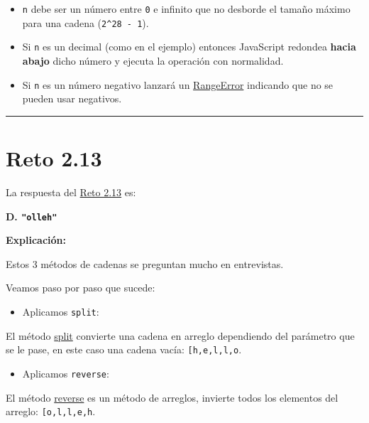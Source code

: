 \documentclass[
  letterpaper,
  DIV=11,
  numbers=noendperiod]{scrreprt}
\providecommand{\tightlist}{%
  \setlength{\itemsep}{0pt}\setlength{\parskip}{0pt}}
\begin{document}
\begin{itemize}
\item
  \texttt{n} debe ser un número entre \texttt{0} e infinito que no
  desborde el tamaño máximo para una cadena (\texttt{2\^{}28\ -\ 1}).
\item
  Si \texttt{n} es un decimal (como en el ejemplo) entonces JavaScript
  redondea \textbf{hacia abajo} dicho número y ejecuta la operación con
  normalidad.
\item
  Si \texttt{n} es un número negativo lanzará un
  \hyperref[glos-rangeerror]{RangeError} indicando que no se pueden usar
  negativos.
\end{itemize}

\begin{center}\rule{0.5\linewidth}{0.5pt}\end{center}

\section{Reto 2.13}\label{sec-sol-cap2-reto13}

La respuesta del \hyperref[sec-cap2-reto13]{Reto 2.13} es:

\textbf{D. \texttt{"olleh"}}

\textbf{Explicación:}

Estos 3 métodos de cadenas se preguntan mucho en entrevistas.

Veamos paso por paso que sucede:

\begin{itemize}
\tightlist
\item
  Aplicamos \texttt{split}:
\end{itemize}

El método \hyperref[glos-split]{split} convierte una cadena en arreglo
dependiendo del parámetro que se le pase, en este caso una cadena vacía:
\texttt{{[}\textquotesingle{}h\textquotesingle{},\textquotesingle{}e\textquotesingle{},\textquotesingle{}l\textquotesingle{},\textquotesingle{}l\textquotesingle{},\textquotesingle{}o\textquotesingle{}{]}}.

\begin{itemize}
\tightlist
\item
  Aplicamos \texttt{reverse}:
\end{itemize}

El método \hyperref[glos-reverse]{reverse} es un método de arreglos,
invierte todos los elementos del arreglo:
\texttt{{[}\textquotesingle{}o\textquotesingle{},\textquotesingle{}l\textquotesingle{},\textquotesingle{}l\textquotesingle{},\textquotesingle{}e\textquotesingle{},\textquotesingle{}h\textquotesingle{}{]}}.
\end{document}

